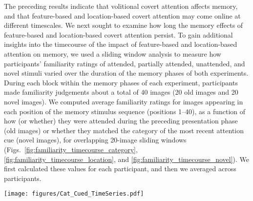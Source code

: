 \documentclass[english]{article}
\newcommand{\timecourseCuedCategory}{S3}
\newcommand{\timecourseUncuedCategory}{S4}
\begin{document}
The preceding results indicate that volitional covert attention affects memory, and that feature-based and location-based covert attention may come online at different timescales.  We next sought to examine how long the memory effects of feature-based and location-based covert attention persist.  To gain additional insights into the timecourse of the impact of feature-based and location-based attention on memory, we used a sliding window analysis to measure how participants' familiarity ratings of attended, partially attended, unattended, and novel stimuli varied over the duration of the memory phases of both experiments.  During each block within the memory phases of each experiment, participants made familiarity judgements about a total of 40 images (20 old images and 20 novel images).  We computed average familiarity ratings for images appearing in each position of the memory stimulus sequence (positions 1--40), as a function of how (or whether) they were attended during the preceding presentation phase (old images) or whether they matched the category of the most recent attention cue (novel images), for overlapping 20-image sliding windows (Figs.~\ref{fig:familiarity_timecourse_category}, \ref{fig:familiarity_timecourse_location}, and \ref{fig:familiarity_timecourse_novel}). We first calculated these values for each participant, and then we averaged across participants.

\begin{figure*}[tp]
  \centering
  \texttt{[image: figures/Cat\_Cued\_TimeSeries.pdf]}
  \caption{\textbf{Familiarity ratings over time for images that matched the cued or uncued image category.}  Each curve reflects the average familiarity ratings for attended, unattended, and novel images (denoted in the legends on the right) within a succession of overlapping 20-image sliding windows.  Error ribbons denote 95\% confidence intervals, computed across participants.  Panels \textbf{a.} and \textbf{c.} display results from the Sustained Attention Experiment and Panels \textbf{b.} and \textbf{d.} display results from the Variable Attention Experiment.  The paired horizontal lines at the bottom of each panel denote timepoints when the given pair of curves was statistically distinguishable (i.e., the topmost line color was statistically greater than the bottommost line color at $\alpha = 0.05$, via a paired two-tailed $t$-test.)  The gray lines in Panels b and d reflect familiarity ratings of novel stimuli from both the most recently attended and unattended image categories.   Figures~\timecourseCuedCategory~and \timecourseUncuedCategory~display these results broken down by participant cohort.}
\label{fig:familiarity_timecourse_category}
\end{figure*}
\end{document}
